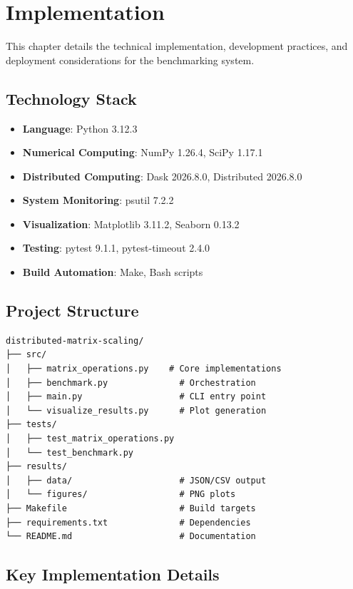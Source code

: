 \chapter{Implementation}

This chapter details the technical implementation, development practices, and deployment considerations for the benchmarking system.

\section{Technology Stack}

\begin{itemize}
    \item \textbf{Language}: Python 3.12.3
    \item \textbf{Numerical Computing}: NumPy 1.26.4, SciPy 1.17.1
    \item \textbf{Distributed Computing}: Dask 2026.8.0, Distributed 2026.8.0
    \item \textbf{System Monitoring}: psutil 7.2.2
    \item \textbf{Visualization}: Matplotlib 3.11.2, Seaborn 0.13.2
    \item \textbf{Testing}: pytest 9.1.1, pytest-timeout 2.4.0
    \item \textbf{Build Automation}: Make, Bash scripts
\end{itemize}

\section{Project Structure}

\begin{verbatim}
distributed-matrix-scaling/
├── src/
│   ├── matrix_operations.py    # Core implementations
│   ├── benchmark.py              # Orchestration
│   ├── main.py                   # CLI entry point
│   └── visualize_results.py      # Plot generation
├── tests/
│   ├── test_matrix_operations.py
│   └── test_benchmark.py
├── results/
│   ├── data/                     # JSON/CSV output
│   └── figures/                  # PNG plots
├── Makefile                      # Build targets
├── requirements.txt              # Dependencies
└── README.md                     # Documentation
\end{verbatim}

\section{Key Implementation Details}

